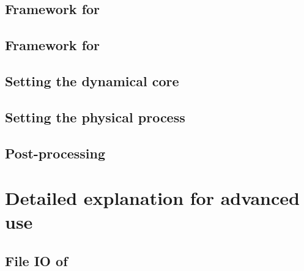 \documentclass[a4paper]{report}
\begin{document}
 \chapter{Framework for \scalerm}
 
 
 
 
 
 \clearpage
 
 
 
 
 
 
 
 

 \chapter{Framework for \scalegm}
 

 \chapter{Setting the dynamical core}
 

 \chapter{Setting the physical process} \label{sec:basic_usel_physics}
 
 
 
 
 
 
 

 \chapter{Post-processing} \label{sec:basic_usel_post}
 


\part{Detailed explanation for advanced use} \label{part:advance_use}
 \chapter{File IO of \scalelib}
 
\end{document}
